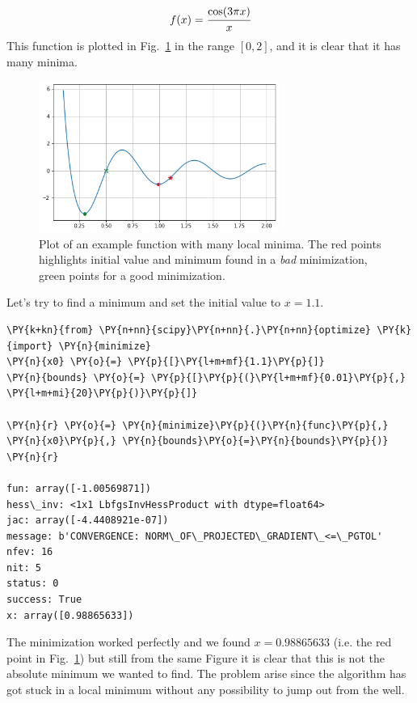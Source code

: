 \[
f(x) = \cfrac{\mathrm{cos}(3\pi x)}{x}
\]
This function is plotted in Fig.~\ref{fig:local_minima} in the range $[0, 2]$, and it is clear that it has many minima. 

\begin{figure}[htb]
	\centering
	\includegraphics[width=0.7\textwidth]{figures/lesson4_39_0.png}
\caption{Plot of an example function with many local minima. The red points highlights initial value and minimum found in a \emph{bad} minimization, green points for a good minimization.}
\label{fig:local_minima}
\end{figure}

Let's try to find a minimum and set the initial value to $x=1.1$.
\begin{tcolorbox}[breakable, size=fbox, boxrule=1pt, pad at break*=1mm,colback=cellbackground, colframe=cellborder]
\begin{Verbatim}[commandchars=\\\{\}]
\PY{k+kn}{from} \PY{n+nn}{scipy}\PY{n+nn}{.}\PY{n+nn}{optimize} \PY{k}{import} \PY{n}{minimize}
\PY{n}{x0} \PY{o}{=} \PY{p}{[}\PY{l+m+mf}{1.1}\PY{p}{]}
\PY{n}{bounds} \PY{o}{=} \PY{p}{[}\PY{p}{(}\PY{l+m+mf}{0.01}\PY{p}{,} \PY{l+m+mi}{20}\PY{p}{)}\PY{p}{]}
		
\PY{n}{r} \PY{o}{=} \PY{n}{minimize}\PY{p}{(}\PY{n}{func}\PY{p}{,} \PY{n}{x0}\PY{p}{,} \PY{n}{bounds}\PY{o}{=}\PY{n}{bounds}\PY{p}{)}
\PY{n}{r}

fun: array([-1.00569871])
hess\_inv: <1x1 LbfgsInvHessProduct with dtype=float64>
jac: array([-4.4408921e-07])
message: b'CONVERGENCE: NORM\_OF\_PROJECTED\_GRADIENT\_<=\_PGTOL'
nfev: 16
nit: 5
status: 0
success: True
x: array([0.98865633])
\end{Verbatim}
\end{tcolorbox}
The minimization worked perfectly and we found $x=0.98865633$ (i.e. the red point in Fig.~\ref{fig:local_minima}) but still from the same Figure it is clear that this is not the absolute minimum we wanted to find. The problem arise since the algorithm has got stuck in a local minimum without any possibility to jump out from the well.

